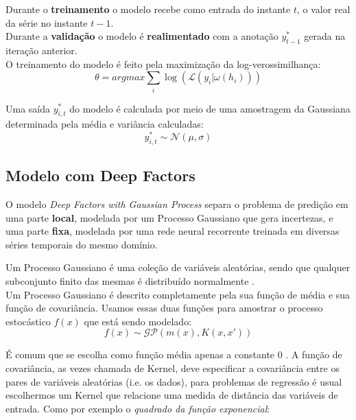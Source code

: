 Durante o \textbf{treinamento} o modelo recebe como entrada do instante $t$, o valor real da série no instante $t-1$. \\
  
Durante a \textbf{validação} o modelo é \textbf{realimentado} com a anotação $y^{*}_{t-1}$ gerada na iteração anterior. \\ 



O treinamento do modelo é feito pela maximização da log-verossimilhança: \\

\[
\theta = argmax \sum_i{\log(\mathcal{L}(y_i | \omega(h_{i})))}
\]


Uma saída $y^*_{i,t}$ do modelo é calculada por meio de uma amostragem da Gaussiana determinada pela média e variância calculadas: \\

\[
 y^*_{i,t} \sim \mathcal{N}(\mu,\sigma) 
\]

\subsection{Modelo com Deep Factors}

O modelo \textit{Deep Factors with Gaussian Process} \citep{deepfactors} separa o problema de predição em uma parte \textbf{local}, modelada por um Processo Gaussiano que gera incertezas, e uma parte \textbf{fixa}, modelada por uma rede neural recorrente treinada em diversas séries temporais do mesmo domínio.


Um Processo Gaussiano é uma coleção de variáveis aleatórias,
sendo que qualquer subconjunto finito das mesmas é distribuído normalmente \citep{gpml}. \\

Um Processo Gaussiano é descrito completamente pela sua função de média e sua função de covariância. Usamos essas duas funções para amostrar o processo estocástico $f(x)$ que está sendo modelado: \\

\[
f(x) \sim \mathcal{GP}( m(x), K(x,x'))
\]

É comum que se escolha como função média apenas a constante 0 \citep{gpml}.  A função de covariância, as vezes chamada de Kernel, deve especificar a covariância entre os pares de variáveis aleatórias (i.e. os dados), para problemas de regressão é usual escolhermos um Kernel que relacione uma medida de distância das variáveis de entrada. Como por exemplo o \textit{quadrado da função exponencial}: \\

